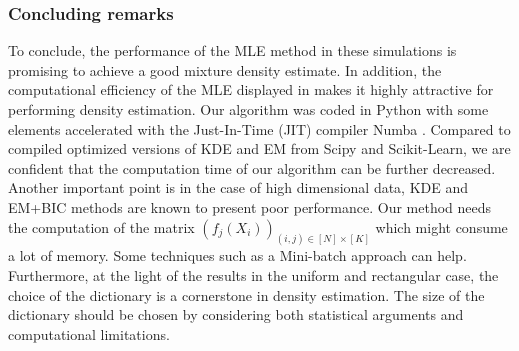 \subsubsection{Concluding remarks} 

To conclude, the performance of the MLE method in these simulations is promising to achieve a 
good mixture density estimate. In addition, the computational efficiency of the MLE displayed in 
 makes it highly attractive for performing density estimation. Our algorithm 
was coded in Python with some elements accelerated with the Just-In-Time (JIT) compiler Numba \citep{numba}. 
Compared to compiled optimized versions of KDE and EM from Scipy and Scikit-Learn\citep{scikit-learn}, 
we are confident that the computation time of our algorithm can be further decreased. Another important 
point is in the case of high dimensional data, KDE and EM+BIC methods are known to present poor 
performance. Our method needs the computation of the matrix $(f_j(X_i))_{(i,j)\in [N]\times [K]}$ 
which might consume a lot of memory. Some techniques such as a Mini-batch approach can help. 
Furthermore, at the light of the results in the uniform and rectangular case, the choice of the 
dictionary is a cornerstone in density estimation. The size of the dictionary should be chosen 
by considering both statistical arguments and computational limitations.



